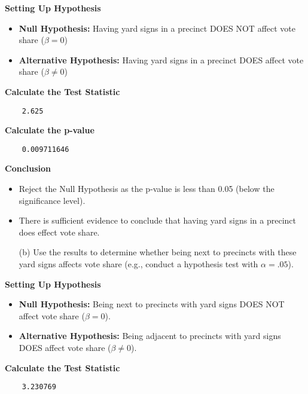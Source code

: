 \documentclass[12pt,letterpaper]{article}
\begin{document}
\noindent\textbf {Setting Up Hypothesis}
\begin{itemize}[left=0pt]
	\item
	\textbf{Null Hypothesis:} Having yard signs in a precinct DOES NOT affect vote share ($\beta = 0$)
	\item
	\textbf{Alternative Hypothesis:} Having yard signs in a precinct DOES affect vote share ($\beta \neq 0$)
\end{itemize}

\vspace{0.2cm}
\noindent\textbf {Calculate the Test Statistic}

\begin{verbatim}
	2.625
\end{verbatim}

\noindent\textbf {Calculate the p-value}

\begin{verbatim}
	0.009711646
\end{verbatim}

\noindent\textbf {Conclusion}
\begin{itemize}[left=0pt]
	\item 
	Reject the Null Hypothesis as the p-value is less than 0.05 (below the significance level).  
	\item 
	There is sufficient evidence to conclude that having yard signs in a precinct does effect vote share. 
\end{itemize}

\newpage
\begin{enumerate}	
	\item [(b)]  Use the results to determine whether being
	next to precincts with these yard signs affects vote
	share (e.g., conduct a hypothesis test with $\alpha = .05$).
\end{enumerate}

\noindent\textbf {Setting Up Hypothesis}
\begin{itemize}[left=0pt]
	\item
	\textbf{Null Hypothesis:} Being next to precincts with yard signs DOES NOT affect vote share ($\beta = 0$).
	\item
	\textbf{Alternative Hypothesis:} Being adjacent to precincts with yard signs DOES affect vote share ($\beta \neq 0$).
\end{itemize}

\noindent\textbf {Calculate the Test Statistic}

\begin{verbatim}
	3.230769
\end{verbatim}
\end{document}
